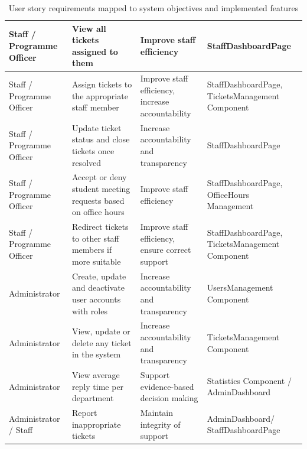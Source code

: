 \begin{table}[H]
\begin{tabularx}{\textwidth}{|L|L|L|L|}
Staff / Programme Officer & View all tickets assigned to them & Improve staff efficiency & StaffDashboardPage \\
\hline

Staff / Programme Officer & Assign tickets to the appropriate staff member & Improve staff efficiency, increase accountability & StaffDashboardPage, TicketsManagement Component \\
\hline

Staff / Programme Officer & Update ticket status and close tickets once resolved & Increase accountability and transparency & StaffDashboardPage \\
\hline

Staff / Programme Officer & Accept or deny student meeting requests based on office hours & Improve staff efficiency & StaffDashboardPage, OfficeHours Management \\
\hline

Staff / Programme Officer & Redirect tickets to other staff members if more suitable & Improve staff efficiency, ensure correct support & StaffDashboardPage, TicketsManagement Component \\
\hline

Administrator & Create, update and deactivate user accounts with roles & Increase accountability and transparency & UsersManagement Component \\
\hline

Administrator & View, update or delete any ticket in the system & Increase accountability and transparency & TicketsManagement Component \\
\hline

Administrator & View average reply time per department & Support evidence-based decision making & Statistics Component / AdminDashboard \\
\hline

Administrator / Staff & Report inappropriate tickets & Maintain integrity of support & AdminDashboard/ StaffDashboardPage \\
\hline

\end{tabularx}
\caption{User story requirements mapped to system objectives and implemented features}
\label{tab:userstories}
\end{table}


